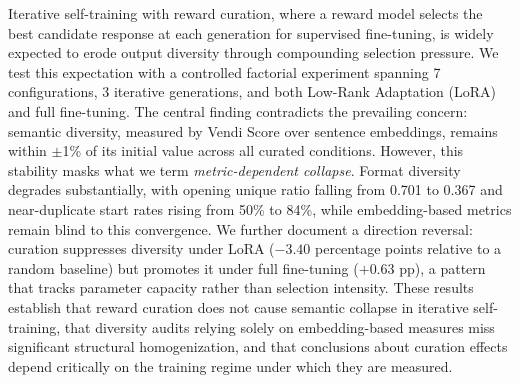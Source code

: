 Iterative self-training with reward curation, where a reward model selects the best candidate response at each generation for supervised fine-tuning, is widely expected to erode output diversity through compounding selection pressure. We test this expectation with a controlled factorial experiment spanning 7 configurations, 3 iterative generations, and both Low-Rank Adaptation (LoRA) and full fine-tuning. The central finding contradicts the prevailing concern: semantic diversity, measured by Vendi Score over sentence embeddings, remains within $\pm$1\% of its initial value across all curated conditions. However, this stability masks what we term \emph{metric-dependent collapse}. Format diversity degrades substantially, with opening unique ratio falling from 0.701 to 0.367 and near-duplicate start rates rising from 50\% to 84\%, while embedding-based metrics remain blind to this convergence. We further document a direction reversal: curation suppresses diversity under LoRA ($-3.40$ percentage points relative to a random baseline) but promotes it under full fine-tuning ($+0.63$ pp), a pattern that tracks parameter capacity rather than selection intensity. These results establish that reward curation does not cause semantic collapse in iterative self-training, that diversity audits relying solely on embedding-based measures miss significant structural homogenization, and that conclusions about curation effects depend critically on the training regime under which they are measured.
